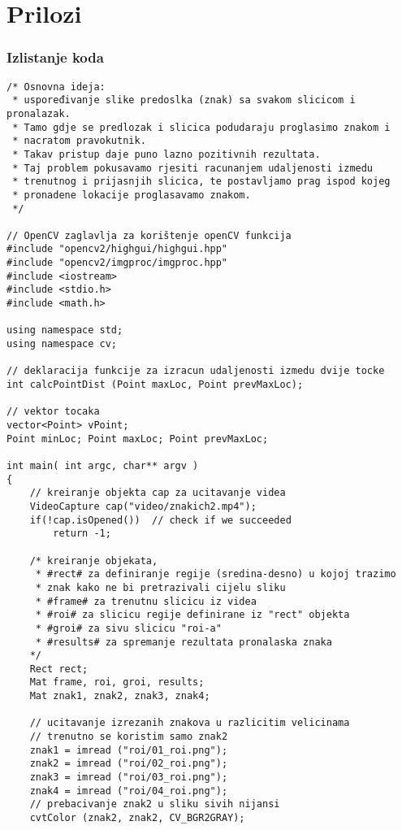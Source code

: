 \newpage

\thispagestyle{empty}
\section*{Prilozi} %
\label{sec:Prilozi}

\subsubsection*{Izlistanje koda} %
\label{ssub:Izlistanje koda}

\begin{lstlisting}[caption={}]
/* Osnovna ideja:
 * uspoređivanje slike predoslka (znak) sa svakom slicicom i pronalazak.
 * Tamo gdje se predlozak i slicica podudaraju proglasimo znakom i 
 * nacratom pravokutnik.
 * Takav pristup daje puno lazno pozitivnih rezultata.
 * Taj problem pokusavamo rjesiti racunanjem udaljenosti izmedu 
 * trenutnog i prijasnjih slicica, te postavljamo prag ispod kojeg
 * pronadene lokacije proglasavamo znakom.
 */ 

// OpenCV zaglavlja za korištenje openCV funkcija
#include "opencv2/highgui/highgui.hpp"
#include "opencv2/imgproc/imgproc.hpp"
#include <iostream>
#include <stdio.h>
#include <math.h>

using namespace std;
using namespace cv;

// deklaracija funkcije za izracun udaljenosti izmedu dvije tocke
int calcPointDist (Point maxLoc, Point prevMaxLoc);

// vektor tocaka
vector<Point> vPoint;
Point minLoc; Point maxLoc; Point prevMaxLoc;

int main( int argc, char** argv )
{
    // kreiranje objekta cap za ucitavanje videa
    VideoCapture cap("video/znakich2.mp4");
    if(!cap.isOpened())  // check if we succeeded
        return -1;

    /* kreiranje objekata, 
     * #rect# za definiranje regije (sredina-desno) u kojoj trazimo 
     * znak kako ne bi pretrazivali cijelu sliku
     * #frame# za trenutnu slicicu iz videa
     * #roi# za slicicu regije definirane iz "rect" objekta
     * #groi# za sivu slicicu "roi-a"
     * #results# za spremanje rezultata pronalaska znaka 
    */
    Rect rect;
    Mat frame, roi, groi, results;
    Mat znak1, znak2, znak3, znak4;
    
    // ucitavanje izrezanih znakova u razlicitim velicinama
    // trenutno se koristim samo znak2 
    znak1 = imread ("roi/01_roi.png");      
    znak2 = imread ("roi/02_roi.png");
    znak3 = imread ("roi/03_roi.png");
    znak4 = imread ("roi/04_roi.png");
    // prebacivanje znak2 u sliku sivih nijansi
    cvtColor (znak2, znak2, CV_BGR2GRAY);
    

\end{lstlisting}

